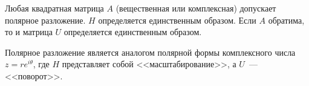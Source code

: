 \documentclass[10pt]{article}
\begin{document}
\begin{theorem}[Существование]
    Любая квадратная матрица $A$ (вещественная или комплексная) допускает полярное разложение. $H$ определяется единственным образом. Если $A$ обратима, то и матрица $U$ определяется единственным образом.
\end{theorem}

\begin{remark}
    Полярное разложение является аналогом полярной формы комплексного числа $z=re^{i\theta}$, где $H$ представляет собой <<масштабирование>>, а $U$~--- <<поворот>>.
\end{remark}
\end{document}
